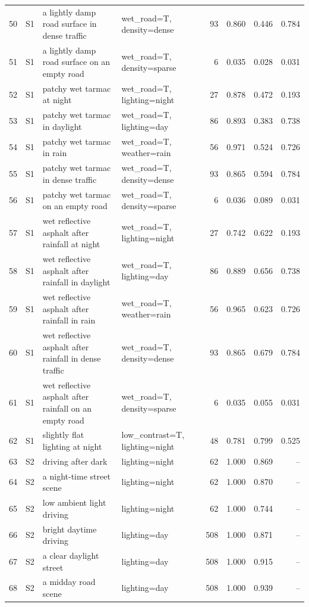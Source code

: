 \begin{longtable}{r l p{5.0cm} p{3.4cm} r r r r}
50 & S1 & a lightly damp road surface in dense traffic & wet\_road=T, density=dense & 93 & 0.860 & 0.446 & 0.784\\
51 & S1 & a lightly damp road surface on an empty road & wet\_road=T, density=sparse & 6 & 0.035 & 0.028 & 0.031\\
52 & S1 & patchy wet tarmac at night & wet\_road=T, lighting=night & 27 & 0.878 & 0.472 & 0.193\\
53 & S1 & patchy wet tarmac in daylight & wet\_road=T, lighting=day & 86 & 0.893 & 0.383 & 0.738\\
54 & S1 & patchy wet tarmac in rain & wet\_road=T, weather=rain & 56 & 0.971 & 0.524 & 0.726\\
55 & S1 & patchy wet tarmac in dense traffic & wet\_road=T, density=dense & 93 & 0.865 & 0.594 & 0.784\\
56 & S1 & patchy wet tarmac on an empty road & wet\_road=T, density=sparse & 6 & 0.036 & 0.089 & 0.031\\
57 & S1 & wet reflective asphalt after rainfall at night & wet\_road=T, lighting=night & 27 & 0.742 & 0.622 & 0.193\\
58 & S1 & wet reflective asphalt after rainfall in daylight & wet\_road=T, lighting=day & 86 & 0.889 & 0.656 & 0.738\\
59 & S1 & wet reflective asphalt after rainfall in rain & wet\_road=T, weather=rain & 56 & 0.965 & 0.623 & 0.726\\
60 & S1 & wet reflective asphalt after rainfall in dense traffic & wet\_road=T, density=dense & 93 & 0.865 & 0.679 & 0.784\\
61 & S1 & wet reflective asphalt after rainfall on an empty road & wet\_road=T, density=sparse & 6 & 0.035 & 0.055 & 0.031\\
62 & S1 & slightly flat lighting at night & low\_contrast=T, lighting=night & 48 & 0.781 & 0.799 & 0.525\\
63 & S2 & driving after dark & lighting=night & 62 & 1.000 & 0.869 & --\\
64 & S2 & a night-time street scene & lighting=night & 62 & 1.000 & 0.870 & --\\
65 & S2 & low ambient light driving & lighting=night & 62 & 1.000 & 0.744 & --\\
66 & S2 & bright daytime driving & lighting=day & 508 & 1.000 & 0.871 & --\\
67 & S2 & a clear daylight street & lighting=day & 508 & 1.000 & 0.915 & --\\
68 & S2 & a midday road scene & lighting=day & 508 & 1.000 & 0.939 & --\\

\end{longtable}
